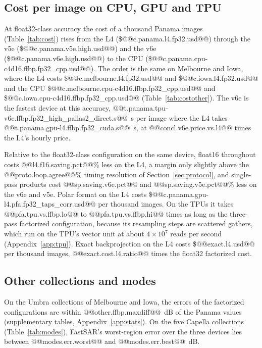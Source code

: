 \documentclass[11pt]{article}
\begin{document}
\subsection{Cost per image on CPU, GPU and TPU}
\label{sec:cost}

At float32-class accuracy the cost of a thousand Panama images (Table~\ref{tab:cost}) rises from the L4 (\$@@c.panama.l4.fp32.usd@@) through the v5e (\$@@c.panama.v5e.high.usd@@) and the v6e (\$@@c.panama.v6e.high.usd@@) to the CPU (\$@@c.panama.cpu-c4d16.ffbp.fp32_cpp.usd@@). The order is the same on Melbourne and Iowa, where the L4 costs \$@@c.melbourne.l4.fp32.usd@@ and \$@@c.iowa.l4.fp32.usd@@ and the CPU \$@@c.melbourne.cpu-c4d16.ffbp.fp32_cpp.usd@@ and \$@@c.iowa.cpu-c4d16.ffbp.fp32_cpp.usd@@ (Table~\ref{tab:costother}). The v6e is the fastest device at this accuracy, @@t.panama.tpu-v6e.ffbp.fp32_high_pallas2_direct.s@@~s per image where the L4 takes @@t.panama.gpu-l4.ffbp.fp32_cuda.s@@~s, at @@concl.v6e.price.vs.l4@@ times the L4's hourly price.

Relative to the float32-class configuration on the same device, float16 throughout costs @@l4.f16.saving.pct@@\% less on the L4, a margin only slightly above the @@proto.loop.agree@@\% timing resolution of Section~\ref{sec:protocol}, and single-pass products cost @@sp.saving.v6e.pct@@ and @@sp.saving.v5e.pct@@\% less on the v6e and v5e. Polar format on the L4 costs \$@@c.panama.gpu-l4.pfa.fp32_taps_corr.usd@@ per thousand images. On the TPUs it takes @@pfa.tpu.vs.ffbp.lo@@ to @@pfa.tpu.vs.ffbp.hi@@ times as long as the three-pass factorized configuration, because its resampling steps are scattered gathers, which run on the TPU's vector unit at about $4 \times 10^7$ reads per second (Appendix~\ref{app:tpu}). Exact backprojection on the L4 costs \$@@exact.l4.usd@@ per thousand images, @@exact.cost.l4.ratio@@ times the float32 factorized cost.


\subsection{Other collections and modes}
\label{sec:general}

On the Umbra collections of Melbourne and Iowa, the errors of the factorized configurations are within @@other.ffbp.maxdiff@@~dB of the Panama values (supplementary tables, Appendix~\ref{app:stats}). On the five Capella collections (Table~\ref{tab:modes}), FastSAR's worst-region error over the three devices lies between @@modes.err.worst@@ and @@modes.err.best@@~dB.
\end{document}
